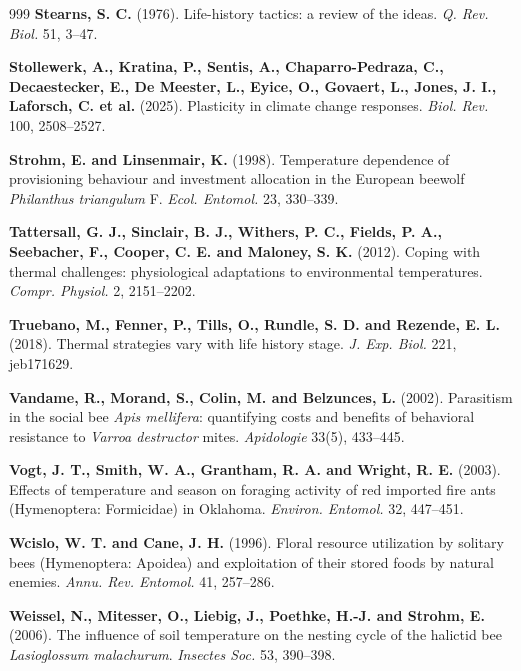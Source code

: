 \documentclass[11pt,a4paper]{article}
\begin{document}
\begin{thebibliography}{999}
\textbf{Stearns, S. C.} (1976).
Life-history tactics: a review of the ideas.
\textit{Q. Rev. Biol.} 51, 3--47.

\textbf{Stollewerk, A., Kratina, P., Sentis, A., Chaparro-Pedraza, C., Decaestecker, E., De Meester, L., Eyice, O., Govaert, L., Jones, J. I., Laforsch, C. et al.} (2025).
Plasticity in climate change responses.
\textit{Biol. Rev.} 100, 2508--2527.

\textbf{Strohm, E. and Linsenmair, K.} (1998). Temperature dependence of provisioning behaviour and investment allocation in the European beewolf \textit{Philanthus triangulum} F. \textit{Ecol. Entomol.} 23, 330--339.

\textbf{Tattersall, G. J., Sinclair, B. J., Withers, P. C., Fields, P. A., Seebacher, F., Cooper, C. E. and Maloney, S. K.} (2012).
Coping with thermal challenges: physiological adaptations to environmental temperatures.
\textit{Compr. Physiol.} 2, 2151--2202.

\textbf{Truebano, M., Fenner, P., Tills, O., Rundle, S. D. and Rezende, E. L.} (2018). Thermal strategies vary with life history stage. \textit{J. Exp. Biol.} 221, jeb171629.

\textbf{Vandame, R., Morand, S., Colin, M. and Belzunces, L.} (2002).
Parasitism in the social bee \textit{Apis mellifera}: quantifying costs and benefits of behavioral resistance to \textit{Varroa destructor} mites.
\textit{Apidologie} 33(5), 433--445.

\textbf{Vogt, J. T., Smith, W. A., Grantham, R. A. and Wright, R. E.} (2003). Effects of temperature and season on foraging activity of red imported fire ants (Hymenoptera: Formicidae) in Oklahoma. \textit{Environ. Entomol.} 32, 447--451.

\textbf{Wcislo, W. T. and Cane, J. H.} (1996).
Floral resource utilization by solitary bees (Hymenoptera: Apoidea) and exploitation of their stored foods by natural enemies.
\textit{Annu. Rev. Entomol.} 41, 257--286.

\textbf{Weissel, N., Mitesser, O., Liebig, J., Poethke, H.-J. and Strohm, E.} (2006). The influence of soil temperature on the nesting cycle of the halictid bee \textit{Lasioglossum malachurum}. \textit{Insectes Soc.} 53, 390--398.


\end{thebibliography}
\end{document}

